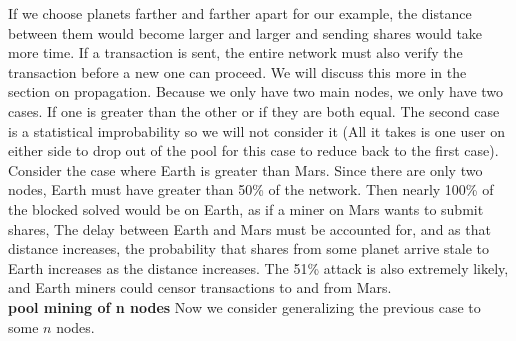 \documentclass[conference]{IEEEtran}
\begin{document}
If we choose planets farther and farther apart for our example, the distance between them would become larger and larger and sending shares would take more time. If a transaction is sent, the entire network must also verify the transaction before a new one can proceed. We will discuss this more in the section on propagation.
Because we only have two main nodes, we only have two cases. If one is greater than the other or if they are both equal. The second case is a statistical improbability so we will not consider it (All it takes is one user on either side to drop out of the pool for this case to reduce back to the first case). Consider the case where Earth is greater than Mars. Since there are only two nodes, Earth must have greater than 50\% of the network. Then nearly 100\% of the blocked solved would be on Earth, as if a miner on Mars wants to submit shares, The delay between Earth and Mars must be accounted for, and as that distance increases, the probability that shares from some planet arrive stale to Earth increases as the distance increases. The 51\% attack is also extremely likely, and Earth miners could censor transactions to and from Mars.\\
\textbf{pool mining of n nodes} Now we consider generalizing the previous case to some $n$ nodes. 

\end{document}
